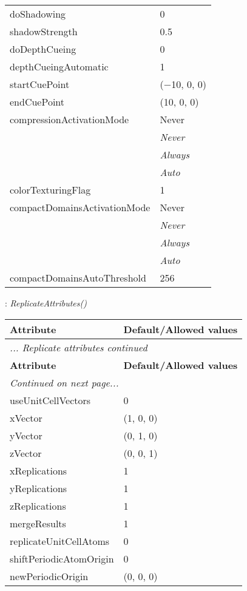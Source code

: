 \documentclass[10pt,a4paper]{report}
\begin{document}
\begin{longtable}{ll}
doShadowing  &  0 \\
shadowStrength  &  0.5 \\
doDepthCueing  &  0 \\
depthCueingAutomatic  &  1 \\
startCuePoint  &  ($-$10, 0, 0) \\
endCuePoint  &  (10, 0, 0) \\
compressionActivationMode  &  Never   \\
 & {\it  Never} \\
 & {\it  Always} \\
 & {\it  Auto} \\
colorTexturingFlag  &  1 \\
compactDomainsActivationMode  &  Never   \\
 & {\it  Never} \\
 & {\it  Always} \\
 & {\it  Auto} \\
compactDomainsAutoThreshold  &  256 \\
\end{longtable}

\newpage

{}
: {\it ReplicateAttributes() }\\[-3mm]

\begin{longtable}{ll}
{\bf Attribute} & {\bf Default/Allowed values} \\
\hline \hline
\endfirsthead
\multicolumn{2}{l}{{\it ... Replicate attributes continued}} \\
{\bf Attribute} & {\bf Default/Allowed values} \\
\hline \hline
\endhead
\hline
\multicolumn{2}{l}{{\it Continued on next page...}} \\
\endfoot
\hline
\endlastfoot

useUnitCellVectors  &  0 \\
xVector  &  (1, 0, 0) \\
yVector  &  (0, 1, 0) \\
zVector  &  (0, 0, 1) \\
xReplications  &  1 \\
yReplications  &  1 \\
zReplications  &  1 \\
mergeResults  &  1 \\
replicateUnitCellAtoms  &  0 \\
shiftPeriodicAtomOrigin  &  0 \\
newPeriodicOrigin  &  (0, 0, 0) \\
\end{longtable}
\end{document}
